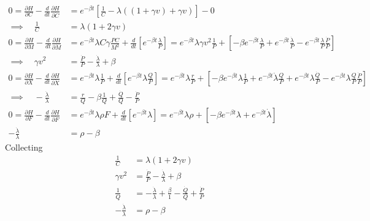 \documentclass[12pt]{article}
\theoremstyle{plain}
\theoremstyle{definition}
\theoremstyle{remark}
\begin{document}
\begin{align*}
  0
  =
  \frac{\partial H}{\partial C}
  -
  \frac{d}{dt}
  \frac{\partial H}{\partial \dot{C}}
  &=
  e^{-\beta t}
  \left[
    \frac{1}{C}
    -
    \lambda
    \left(
    (1+\gamma v)
    + \gamma v
    \right)
  \right]
  -0
  \\
  \implies\quad
  \frac{1}{C}
  &=
    \lambda
    \left(
    1+2\gamma v
    \right)
  \\
  0
  =
  \frac{\partial H}{\partial M}
  -
  \frac{d}{dt}
  \frac{\partial H}{\partial \dot{M}}
  &=
  e^{-\beta t}
  \lambda
  C \gamma \frac{PC}{M^2}
  +
  \frac{d}{dt}
  \left[
  e^{-\beta t}
  \frac{\lambda}{P}
  \right]
  =
  e^{-\beta t}
  \lambda
  \gamma v^2\frac{1}{P}
  +
  \left[
  -\beta e^{-\beta t}
  \frac{\lambda}{P}
  +
  e^{-\beta t}
  \frac{\dot{\lambda}}{P}
  -
  e^{-\beta t}
  \frac{\lambda}{P}
  \frac{\dot{P}}{P}
  \right]
  \\
  \implies\quad
  \gamma v^2
  &=
  \frac{\dot{P}}{P}
  -
  \frac{\dot{\lambda}}{\lambda}
  +
  \beta
  \\
  0
  =
  \frac{\partial H}{\partial X}
  -
  \frac{d}{dt}
  \frac{\partial H}{\partial \dot{X}}
  &=
  e^{-\beta t} \lambda \frac{1}{P}
  +
  \frac{d}{dt}
  \left[
  e^{-\beta t} \lambda \frac{Q}{P}
  \right]
  =
  e^{-\beta t} \lambda \frac{r}{P}
  +
  \left[
  -\beta e^{-\beta t} \lambda \frac{1}{P}
  + e^{-\beta t} \dot{\lambda} \frac{Q}{P}
  + e^{-\beta t} \lambda \frac{\dot{Q}}{P}
  -
  e^{-\beta t} \lambda
  \frac{Q}{P}
  \frac{\dot{P}}{P}
  \right]
  \\
  \implies\quad
  - \frac{\dot{\lambda}}{\lambda}
  &=
  \frac{r}{Q}
  -\beta \frac{1}{Q}
  + \frac{\dot{Q}}{Q}
  -
  \frac{\dot{P}}{P}
  \\
  0
  =
  \frac{\partial H}{\partial F}
  -
  \frac{d}{dt}
  \frac{\partial H}{\partial \dot{F}}
  &=
  e^{-\beta t}
  \lambda \rho F
  +
  \frac{d}{dt}
  \left[
  e^{-\beta t}
  \lambda
  \right]
  =
  e^{-\beta t}
  \lambda \rho
  +
  \left[
  -\beta
  e^{-\beta t}
  \lambda
  +
  e^{-\beta t}
  \dot{\lambda}
  \right]
  \\
  -\frac{\dot{\lambda}}{\lambda}
  &=
  \rho
  -\beta
\end{align*}
Collecting
\begin{align*}
  \frac{1}{C}
  &=
    \lambda
    \left(
    1+2\gamma v
    \right)
  \\
  \gamma v^2
  &=
  \frac{\dot{P}}{P}
  -
  \frac{\dot{\lambda}}{\lambda}
  +
  \beta
  \\
  \frac{1}{Q}
  &=
  -\frac{\dot{\lambda}}{\lambda}
  +\frac{\beta}{1}
  -\frac{\dot{Q}}{Q}
  +
  \frac{\dot{P}}{P}
  \\
  -\frac{\dot{\lambda}}{\lambda}
  &=
  \rho
  -\beta
\end{align*}
\end{document}
